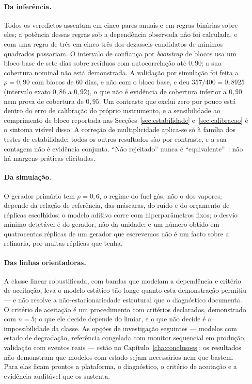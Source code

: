 \paragraph{Da inferência.} Todos os veredictos assentam em cinco pares
anuais e em regras binárias sobre eles; a potência dessas regras sob a
dependência observada não foi calculada, e com uma regra de três em cinco
três dos dezasseis candidatos de mínimos quadrados passariam. O intervalo de
confiança por \emph{bootstrap} de blocos usa um bloco base de sete dias
sobre resíduos com autocorrelação até $0{,}90$; a sua cobertura nominal não
está demonstrada. A validação por simulação foi feita a $\rho = 0{,}90$ com
blocos de 60 dias, e não com o bloco base, e deu $357/400 = 0{,}8925$
(intervalo exato $0{,}86$ a $0{,}92$), o que não é evidência de cobertura
inferior a $0{,}90$ nem prova de cobertura de $0{,}95$. Um
contraste que exclui zero por pouco está dentro do erro de calibração do
próprio instrumento, e a sensibilidade ao comprimento de bloco reportada
nas Secções~\ref{sec:estabilidade} e~\ref{sec:calibracao} é o sintoma
visível disso. A correção de multiplicidade aplica-se só à família dos
testes de estabilidade; todos os outros resultados são por contraste, e a
sua contagem não é evidência conjunta. ``Não rejeitado'' nunca é
``equivalente''~\cite{Lakens2017}: não há margens práticas elicitadas.

\paragraph{Da simulação.} O gerador primário tem $\rho = 0{,}6$, o regime do
fuel gás, não o dos vapores; depende da relação de referência, das
máscaras, do ruído e do orçamento de réplicas escolhidos; o modelo aditivo
corre com hiperparâmetros fixos; o desvio mínimo detetável é do gerador, não
da unidade; e um número obtido em quatrocentas réplicas de um gerador que
escrevemos não é um facto sobre a refinaria, por muitas réplicas que tenha.

\paragraph{Das linhas orientadoras.} A classe linear robustificada, com
bandas que modelam a dependência e critério de aceitação, leva o modelo
estático tão longe quanto esta demonstração permitiu --- e não resolve a não-estacionariedade estrutural que o
diagnóstico documenta. O critério de aceitação é um procedimento com
critérios declarados, demonstrado com $n = 5$; o que ele decide depende do
limiar, e o que não decide é a impossibilidade da classe. As opções
de investigação seguintes --- modelos com estado de degradação, referência
congelada com monitor sequencial em produção, validação com eventos reais
--- estão no Capítulo~\ref{cha:conclusoes}; os resultados não demonstram que
modelos com estado sejam necessários nem que bastem. Para elas ficam prontos
a plataforma, o diagnóstico, o critério de aceitação e a evidência auditável
que os sustenta.

